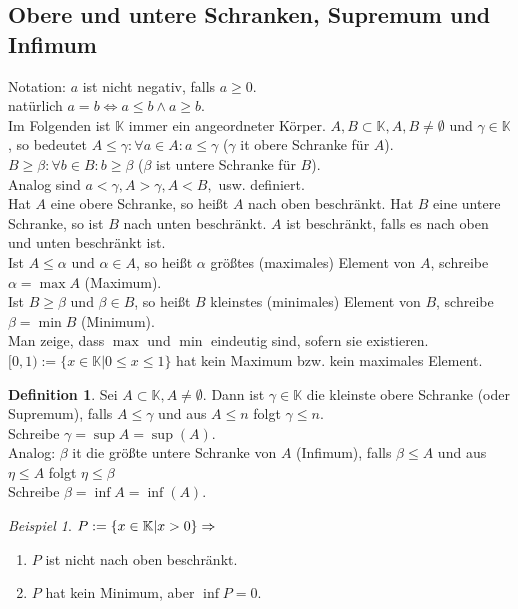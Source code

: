\documentclass[12pt,a4paper,titlepage]{article} %
\theoremstyle{definition}
\newtheorem{defi}[satz]{Definition}
\theoremstyle{remark}
\newtheorem*{bsp}{Beispiel}
\begin{document}
\subsection{Obere und untere Schranken, Supremum und Infimum}
Notation: $a$ ist nicht negativ, falls $a\geq 0$.
\\natürlich $a=b\Leftrightarrow a\leq b \wedge a \geq b$.\\
Im Folgenden ist $\mathbb{K}$ immer ein angeordneter Körper. $A,B \subset \mathbb{K}, A,B\neq \emptyset$ und $\gamma \in \mathbb{K}$, so bedeutet $A\leq \gamma: \forall a\in A: a \leq \gamma$ ($\gamma$ it obere Schranke für $A$).\\
$B\geq \beta: \forall b\in B: b\geq \beta$ ($\beta$ ist untere Schranke für $B$).\\
Analog sind $a<\gamma, A>\gamma, A<B,$ usw. definiert.\\
Hat $A$ eine obere Schranke, so heißt $A$ nach oben beschränkt. Hat $B$ eine untere Schranke, so ist $B$ nach unten beschränkt. $A$ ist beschränkt, falls es nach oben und unten beschränkt ist.\\
Ist $A\leq \alpha$ und $\alpha\in A$, so heißt $\alpha$ größtes (maximales) Element von $A$, schreibe $\alpha = \max A$ (Maximum).\\
Ist $B\geq \beta$ und $\beta\in B$, so heißt $B$ kleinstes (minimales) Element von $B$, schreibe $\beta = \min B$ (Minimum).\\
Man zeige, dass $\max$ und $\min$ eindeutig sind, sofern sie existieren.\\
$[0,1) := \{x\in\mathbb{K}|0\leq x\leq 1\}$ hat kein Maximum bzw. kein maximales Element.
\begin{defi}
	Sei $A\subset \mathbb{K}, A\neq \emptyset$. Dann ist $\gamma\in\mathbb{K}$ die kleinste obere Schranke (oder Supremum), falls $A\leq \gamma$ und aus $A\leq n$ folgt $\gamma \leq n$.\\
	Schreibe $\gamma = \sup A = \sup(A)$.\\
	Analog: $\beta$ it die größte untere Schranke von $A$ (Infimum), falls $\beta \leq A$ und aus $\eta \leq A$ folgt $\eta \leq \beta$\\
	Schreibe $\beta = \inf A = \inf(A)$.
\end{defi}
\begin{bsp}
	$P := \{x\in\mathbb{K}|x>0\}\\
	\Rightarrow$
	\begin{enumerate}
		\item $P$ ist nicht nach oben beschränkt.
		\item $P$ hat kein Minimum, aber $\inf P = 0$.
	\end{enumerate}
\end{bsp}
\end{document}
